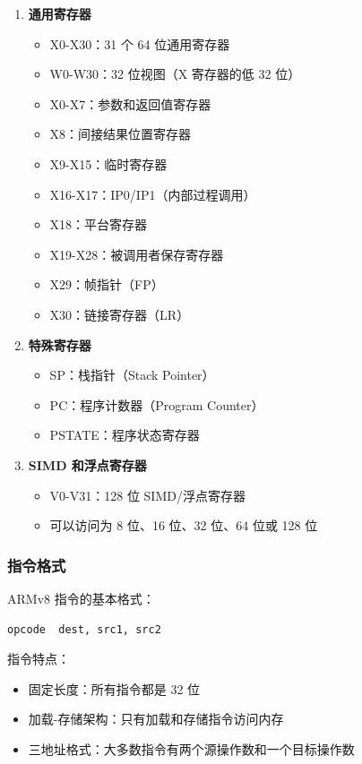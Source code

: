 \begin{enumerate}
  \item \textbf{通用寄存器}
    \begin{itemize}
      \item X0-X30：31 个 64 位通用寄存器
      \item W0-W30：32 位视图（X 寄存器的低 32 位）
      \item X0-X7：参数和返回值寄存器
      \item X8：间接结果位置寄存器
      \item X9-X15：临时寄存器
      \item X16-X17：IP0/IP1（内部过程调用）
      \item X18：平台寄存器
      \item X19-X28：被调用者保存寄存器
      \item X29：帧指针（FP）
      \item X30：链接寄存器（LR）
    \end{itemize}

  \item \textbf{特殊寄存器}
    \begin{itemize}
      \item SP：栈指针（Stack Pointer）
      \item PC：程序计数器（Program Counter）
      \item PSTATE：程序状态寄存器
    \end{itemize}

  \item \textbf{SIMD 和浮点寄存器}
    \begin{itemize}
      \item V0-V31：128 位 SIMD/浮点寄存器
      \item 可以访问为 8 位、16 位、32 位、64 位或 128 位
    \end{itemize}
\end{enumerate}

\subsubsection{指令格式}

ARMv8 指令的基本格式：

\begin{lstlisting}[language={[ARM]Assembler}]
  opcode  dest, src1, src2
\end{lstlisting}

指令特点：
\begin{itemize}
  \item 固定长度：所有指令都是 32 位
  \item 加载-存储架构：只有加载和存储指令访问内存
  \item 三地址格式：大多数指令有两个源操作数和一个目标操作数
\end{itemize}

